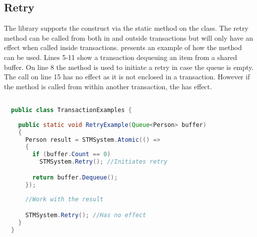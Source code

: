 \subsection{Retry}\label{subsec:impl_retry}
The library supports the  construct via the static  method on the  class. The retry method can be called from both in and outside transactions but will only have an effect when called inside transactions.  presents an example of how the  method can be used. Lines 5-11 show a transaction dequeuing an item from a shared buffer. On line 8 the  method is used to initiate a retry in case the queue is empty. The call on line 15 has no effect as it is not enclosed in a transaction. However if the  method is called from within another transaction, the  has effect.

\begin{lstlisting}[label=lst:library_retry,
  caption={Library \bscode{Retry}},
  language=Java,  
  showspaces=false,
  showtabs=false,
  breaklines=true,
  showstringspaces=false,
  breakatwhitespace=true,
  commentstyle=\color{greencomments},
  keywordstyle=\color{bluekeywords},
  stringstyle=\color{redstrings},
  morekeywords={atomic, retry, orElse, var, get, set}]  % Start your code-block

  public class TransactionExamples {
    
    public static void RetryExample(Queue<Person> buffer)
    {
      Person result = STMSystem.Atomic(() =>
      {
        if (buffer.Count == 0)
          STMSystem.Retry(); //Initiates retry

        return buffer.Dequeue();
      });
      
      //Work with the result

      STMSystem.Retry(); //Has no effect
    }
  }
\end{lstlisting}
